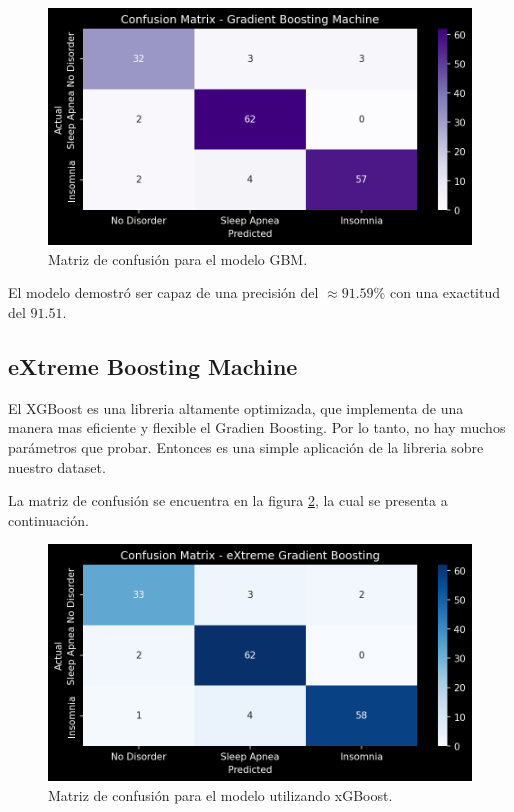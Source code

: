 \documentclass{replab}
\begin{document}
\begin{figure}[hbt!]
    \centering
    \includegraphics[width=0.85\columnwidth]{imagenes/GBM.png}
    \caption{Matriz de confusión para el modelo GBM.}
    \label{fig:matrizGBM}
\end{figure}

El modelo demostró ser capaz de una precisión del $\approx 91.59 \%$ con una exactitud del $91.51$.

    \subsection{eXtreme Boosting Machine}

El XGBoost es una libreria altamente optimizada, que implementa de una manera mas eficiente y flexible el Gradien Boosting. Por lo tanto, no hay muchos parámetros que probar. Entonces es una simple aplicación de la libreria sobre nuestro dataset.

La matriz de confusión se encuentra en la figura \ref{fig:matrizXGB}, la cual se presenta a continuación.

\begin{figure}[hbt!]
    \centering
    \includegraphics[width=0.85\columnwidth]{imagenes/XGB.png}
    \caption{Matriz de confusión para el modelo utilizando xGBoost.}
    \label{fig:matrizXGB}
\end{figure}
\end{document}
